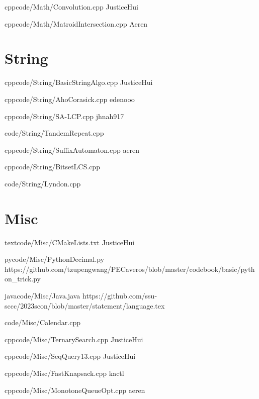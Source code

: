 \documentclass[landscape, 8pt, a4paper, oneside]{extarticle}
\begin{document}
\begin{multicols*}{3}
{}{}
{cpp}{code/Math/Convolution.cpp}
{JusticeHui}

{}{}
{cpp}{code/Math/MatroidIntersection.cpp}
{Aeren}

\section{String}

{}{}
{cpp}{code/String/BasicStringAlgo.cpp}
{JusticeHui}

{}{}
{cpp}{code/String/AhoCorasick.cpp}
{edenooo}

{}{}
{cpp}{code/String/SA-LCP.cpp}
{jhnah917}

{code/String/TandemRepeat.cpp}

{}{}
{cpp}{code/String/SuffixAutomaton.cpp}
{aeren}

{}{}
{cpp}{code/String/BitsetLCS.cpp}

{code/String/Lyndon.cpp}

\section{Misc}

{}{}
{text}{code/Misc/CMakeLists.txt}
{JusticeHui}

{}{}
{py}{code/Misc/PythonDecimal.py}
{https://github.com/tzupengwang/PECaveros/blob/master/codebook/basic/python_trick.py}

{}{}
{java}{code/Misc/Java.java}
{https://github.com/ssu-sccc/2023scon/blob/master/statement/language.tex}

{code/Misc/Calendar.cpp}

{}{}
{cpp}{code/Misc/TernarySearch.cpp}
{JusticeHui}

{}{}
{cpp}{code/Misc/SeqQuery13.cpp}
{JusticeHui}

{}{}
{cpp}{code/Misc/FastKnapsack.cpp}
{kactl}

{}{}
{cpp}{code/Misc/MonotoneQueueOpt.cpp}
{aeren}


\end{multicols*}
\end{document}
